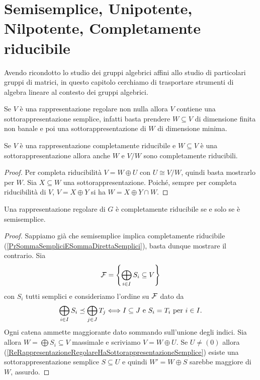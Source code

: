 \chapter{Semisemplice, Unipotente, Nilpotente, Completamente riducibile}

Avendo ricondotto lo studio dei gruppi algebrici affini allo studio di particolari gruppi di matrici, in questo capitolo cerchiamo di trasportare strumenti di algebra lineare al contesto dei gruppi algebrici.


\begin{remark}\label{ReRappresentazioneRegolareHaSottorappresentazioneSemplice}
Se $V$ \`e una rappresentazione regolare non nulla allora $V$ contiene una sottorappresentazione semplice, infatti basta prendere $W\subseteq V$ di dimensione finita non banale e poi una sottorappresentazione di $W$ di dimensione minima.
\end{remark}

\begin{lemma}[]\label{LmSottorappresentazioneCompletamenteRiducibileECompletamenteRiducibile}
Se $V$ \`e una rappresentazione completamente riducibile e $W\subseteq V$ \`e una sottorappresentazione allora anche $W$ e $V/W$ sono completamente riducibili.
\end{lemma}
\begin{proof}
Per completa riducibilit\`a $V=W\oplus U$ con $U\cong V/W$, quindi basta mostrarlo per $W$. Sia $X\subseteq W$ una sottorappresentazione. Poich\'e, sempre per completa riducibilit\`a di $V$, $V=X\oplus Y$ si ha $W=X\oplus Y\cap W$.
\end{proof}

\begin{proposition}\label{PrSemisempliceEquivaleCompletamenteRiducibile}
Una rappresentazione regolare di $G$ \`e completamente riducibile se e solo se \`e semisemplice.
\end{proposition}
\begin{proof}
Sappiamo gi\`a che semisemplice implica completamente riducibile (\ref{PrSommaSempliciESommaDirettaSemplici}), basta dunque mostrare il contrario. Sia
\[\mathcal{F}=\left\{ \bigoplus_{i\in I}S_i\subseteq V\right\}\]
con $S_i$ tutti semplici e consideriamo l'ordine su $\mathcal{F}$ dato da
\[\bigoplus_{i\in I}S_i\preceq \bigoplus_{j\in J}T_j\Longleftrightarrow I\subseteq J\text{ e }S_i=T_i\text{ per $i\in I$}.\]
Ogni catena ammette maggiorante dato sommando sull'unione degli indici. Sia allora $W=\bigoplus S_i\subseteq V$ massimale e scriviamo $V=W\oplus U$. Se $U\neq (0)$ allora (\ref{ReRappresentazioneRegolareHaSottorappresentazioneSemplice}) esiste una sottorappresentazione semplice $S\subseteq U$ e quindi $W'=W\oplus S$ sarebbe maggiore di $W$, assurdo.
\end{proof}

